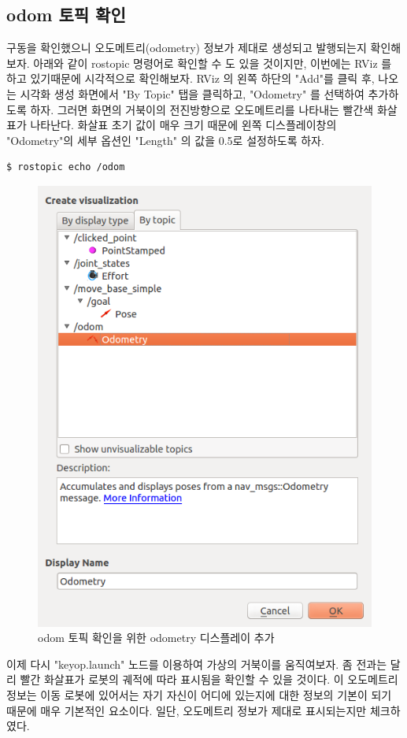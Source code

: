 \subsection{odom 토픽 확인}

구동을 확인했으니 오도메트리(odometry) 정보가 제대로 생성되고 발행되는지 확인해보자. 아래와 같이 rostopic 명령어로 확인할 수 도 있을 것이지만, 이번에는 RViz 를 하고 있기때문에 시각적으로 확인해보자. RViz 의 왼쪽 하단의 "Add"를 클릭 후, 나오는 시각화 생성 화면에서 "By Topic" 탭을 클릭하고, "Odometry" 를 선택하여 추가하도록 하자. 그러면 화면의 거북이의 전진방향으로 오도메트리를 나타내는 빨간색 화살표가 나타난다. 화살표 초기 값이 매우 크기 때문에 왼쪽 디스플레이창의 "Odometry"의 세부 옵션인 "Length" 의 값을 0.5로 설정하도록 하자.

\vspace{\baselineskip}
\begin{lstlisting}[language=ROS]
$ rostopic echo /odom
\end{lstlisting}

\begin{figure}[h]
\centering\includegraphics[width=0.7\columnwidth]{pictures/chapter10/rviz_odom.png}
\caption{odom 토픽 확인을 위한 odometry 디스플레이 추가}
\end{figure}

이제 다시 "keyop.launch" 노드를 이용하여 가상의 거북이를 움직여보자. 좀 전과는 달리 빨간 화살표가 로봇의 궤적에 따라 표시됨을 확인할 수 있을 것이다. 이 오도메트리 정보는 이동 로봇에 있어서는 자기 자신이 어디에 있는지에 대한 정보의 기본이 되기 때문에 매우 기본적인 요소이다. 일단, 오도메트리 정보가 제대로 표시되는지만 체크하였다.

